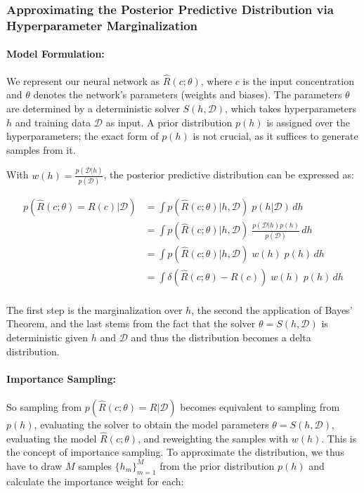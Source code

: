 \subsubsection{Approximating the Posterior Predictive Distribution via Hyperparameter Marginalization}

\paragraph{Model Formulation:}

We represent our neural network as $\hat{R}(c; \theta)$, where $c$ is the input concentration and $\theta$ denotes the network's parameters (weights and biases). The parameters $\theta$ are determined by a deterministic solver $S(h, \mathcal{D})$, which takes hyperparameters $h$ and training data $\mathcal{D}$ as input. A prior distribution $p(h)$ is assigned over the hyperparameters; the exact form of $p(h)$ is not crucial, as it suffices to generate samples from it.

With $w(h) = \frac{p(\mathcal{D} | h)}{p(\mathcal{D})}$, the posterior predictive distribution can be expressed as:

\begin{align*}
p(\hat{R}(c; \theta) = R(c)| \mathcal{D}) &= \int p(\hat{R}(c; \theta) | h, \mathcal{D})\; p(h | \mathcal{D}) \, dh \\
                                          &= \int p(\hat{R}(c; \theta) | h, \mathcal{D})\; \frac{p(\mathcal{D} | h) p(h)}{p(\mathcal{D})} \, dh \\
                                          &= \int p(\hat{R}(c; \theta) | h, \mathcal{D})\; w(h)\; p(h) \, dh \\
                                          &= \int \delta(\hat{R}(c; \theta) - R(c))\; w(h)\; p(h) \, dh \\
\end{align*}

The first step is the marginalization over $h$, the second the application of Bayes' Theorem, and the last stems from the fact that the solver $\theta = S(h, \mathcal{D})$ is deterministic given $h$ and $\mathcal{D}$ and thus the distribution becomes a delta distribution.


\paragraph{Importance Sampling:}

So sampling from $p(\hat{R}(c; \theta) = R| \mathcal{D})$ becomes equivalent to sampling from $p(h)$, evaluating the solver to obtain the model parameters $\theta = S(h, \mathcal{D})$, evaluating the model $\hat{R}(c; \theta)$, and reweighting the samples with $w(h)$. This is the concept of importance sampling. To approximate the distribution, we thus have to draw $M$ samples $\{h_m\}_{m=1}^M$ from the prior distribution $p(h)$ and calculate the importance weight for each:

